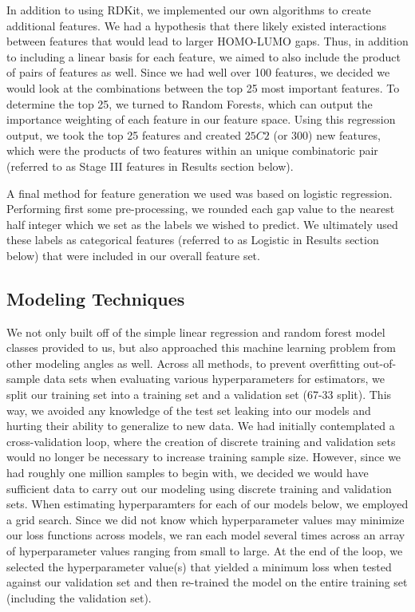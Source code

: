 \documentclass[11pt, oneside]{article}   	%
\begin{document}
In addition to using RDKit, we implemented our own algorithms to create additional features. We had a hypothesis that there likely existed interactions between features that would lead to larger HOMO-LUMO gaps. Thus, in addition to including a linear basis for each feature, we aimed to also include the product of pairs of features as well. Since we had well over 100 features, we decided we would look at the combinations between the top 25 most important features. To determine the top 25, we turned to Random Forests, which can output the importance weighting of each feature in our feature space. Using this regression output, we took the top 25 features and created $25C2$ (or 300) new features, which were the products of two features within an unique combinatoric pair (referred to as Stage III features in Results section below). 

A final method for feature generation we used was based on logistic regression. Performing first some pre-processing, we rounded each gap value to the nearest half integer which we set as the labels we wished to predict. We ultimately used these labels as categorical features (referred to as Logistic in Results section below) that were included in our overall feature set. 

\subsection{Modeling Techniques} 

We not only built off of the simple linear regression and random forest model classes provided to us, but also approached this machine learning problem from other modeling angles as well. Across all methods, to prevent overfitting out-of-sample data sets when evaluating various hyperparameters for estimators, we split our training set into a training set and a validation set (67-33 split). This way, we avoided any knowledge of the test set leaking into our models and hurting their ability to generalize to new data. We had initially contemplated a cross-validation loop, where the creation of discrete training and validation sets would no longer be necessary to increase training sample size. However, since we had roughly one million samples to begin with, we decided we would have sufficient data to carry out our modeling using discrete training and validation sets. When estimating hyperparamters for each of our models below, we employed a grid search. Since we did not know which hyperparameter values may minimize our loss functions across models, we ran each model several times across an array of hyperparameter values ranging from small to large. At the end of the loop, we selected the hyperparameter value(s) that yielded a minimum loss when tested against our validation set and then re-trained the model on the entire training set (including the validation set).
\end{document}

